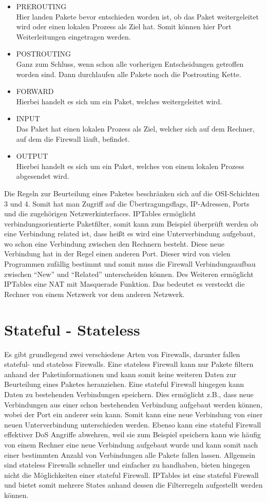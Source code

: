 \begin{itemize}
	\item PREROUTING \\
	Hier landen Pakete bevor entschieden worden ist, ob das Paket weitergeleitet wird oder einen lokalen Prozess als Ziel hat. Somit können hier Port Weiterleitungen eingetragen werden.
	\item POSTROUTING \\
	Ganz zum Schluss, wenn schon alle vorherigen Entscheidungen getroffen worden sind. Dann durchlaufen alle Pakete noch die Postrouting Kette.
	\item FORWARD \\
	Hierbei handelt es sich um ein Paket, welches weitergeleitet wird.
	\item INPUT \\
	Das Paket hat einen lokalen Prozess als Ziel, welcher sich auf dem Rechner, auf dem die Firewall läuft, befindet.
	\item OUTPUT \\
	Hierbei handelt es sich um ein Paket, welches von einem lokalen Prozess abgesendet wird.
\end{itemize}
Die Regeln zur Beurteilung eines Paketes beschränken sich auf die OSI-Schichten 3 und 4. Somit hat man Zugriff auf die Übertragungsflags, IP-Adressen, Ports und die zugehörigen Netzwerkinterfaces. IPTables ermöglicht verbindungsorientierte Paketfilter, somit kann zum Beispiel überprüft werden ob eine Verbindung related ist, dass heißt es wird eine Unterverbindung aufgebaut, wo schon eine Verbindung zwischen den Rechnern besteht. Diese neue Verbindung hat in der Regel einen anderen Port. Dieser wird von vielen Programmen zufällig bestimmt und somit muss die Firewall Verbindungsaufbau zwischen "`New"' und "`Related"' unterscheiden können. Des Weiteren ermöglicht IPTables eine NAT mit Masquerade Funktion. Das bedeutet es versteckt die Rechner von einem Netzwerk vor dem anderen Netzwerk.

\section{Stateful - Stateless}
Es gibt grundlegend zwei verschiedene Arten von Firewalls, darunter fallen stateful- und stateless Firewalls. Eine stateless Firewall kann nur Pakete filtern anhand der Paketinformationen und kann somit keine weiteren Daten zur Beurteilung eines Paketes heranziehen. Eine stateful Firewall hingegen kann Daten zu bestehenden Verbindungen speichern. Dies ermöglicht z.B., dass neue Verbindungen aus einer schon bestehenden Verbindung aufgebaut werden können, wobei der Port ein anderer sein kann. Somit kann eine neue Verbindung von einer neuen Unterverbindung unterschieden werden. Ebenso kann eine stateful Firewall effektiver DoS Angriffe abwehren, weil sie zum Beispiel speichern kann wie häufig von einem Rechner eine neue Verbindung aufgebaut wurde und kann somit nach einer bestimmten Anzahl von Verbindungen alle Pakete fallen lassen. Allgemein sind stateless Firewalls schneller und einfacher zu handhaben, bieten hingegen nicht die Möglichkeiten einer stateful Firewall. IPTables ist eine stateful Firewall und bietet somit mehrere States anhand dessen die Filterregeln aufgestellt werden können.

